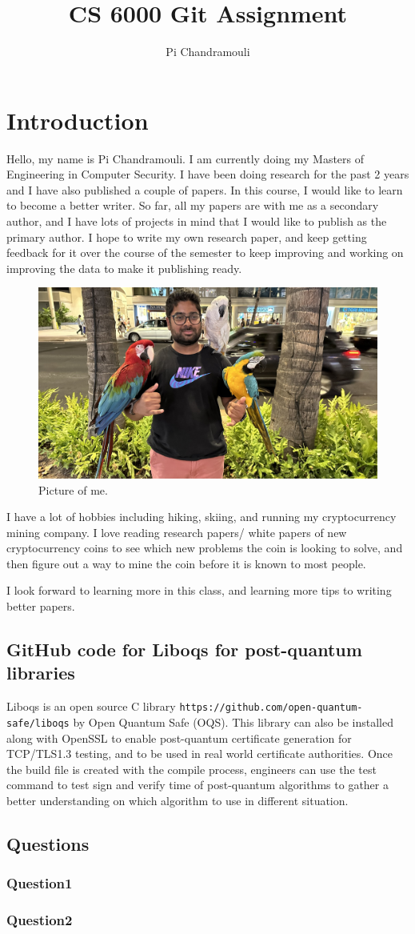 \documentclass{article}
\title{CS 6000 Git Assignment}
\author{Pi Chandramouli}
\begin{document}
\maketitle


\section{Introduction}

Hello, my name is Pi Chandramouli. I am currently doing my Masters of Engineering in Computer Security. I have been doing research for the past 2 years and I have also published a couple of papers. In this course, I would like to learn to become a better writer. So far, all my papers are with me as a secondary author, and I have lots of projects in mind that I would like to publish as the primary author. I hope to write my own research paper, and keep getting feedback for it over the course of the semester to keep improving and working on improving the data to make it publishing ready.

\begin{figure}[!htb]
\centering
\includegraphics[width=0.5\columnwidth]{pi-F23.jpeg}
\caption{\label{fig:me} Picture of me.}
\end{figure}

I have a lot of hobbies including hiking, skiing, and running my cryptocurrency mining company. I love reading research papers/ white papers of new cryptocurrency coins to see which new problems the coin is looking to solve, and then figure out a way to mine the coin before it is known to most people. 

I look forward to learning more in this class, and learning more tips to writing better papers.

\subsection{GitHub code for Liboqs for post-quantum libraries}
Liboqs is an open source C library \nolinkurl{https://github.com/open-quantum-safe/liboqs} by Open Quantum Safe (OQS). This library can also be installed along with OpenSSL to enable post-quantum certificate generation for TCP/TLS1.3 testing, and to be used in real world certificate authorities. Once the build file is created with the compile process, engineers can use the test command to test sign and verify time of post-quantum algorithms to gather a better understanding on which algorithm to use in different situation.

\subsection{Questions}

\subsubsection{Question1}

\subsubsection{Question2}
    
\end{document}
